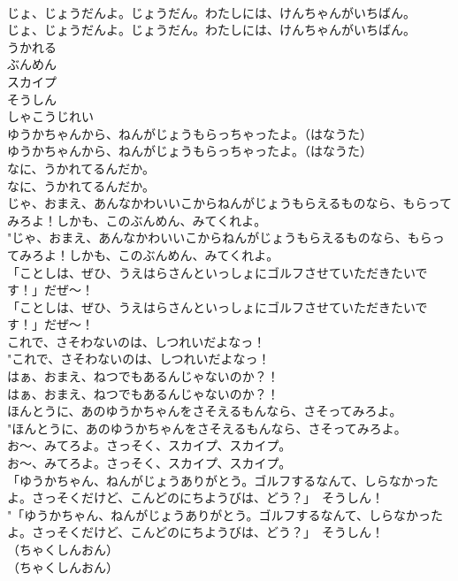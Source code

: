 \documentclass[8pt]{extreport}
\begin{document}
\begin{CJK}{UTF8}{min}
\\	じょ、じょうだんよ。じょうだん。わたしには、けんちゃんがいちばん。	
\\	じょ、じょうだんよ。じょうだん。わたしには、けんちゃんがいちばん。 
\\	うかれる
\\	ぶんめん
\\	スカイプ
\\	そうしん
\\	しゃこうじれい
\\	ゆうかちゃんから、ねんがじょうもらっちゃったよ。（はなうた）	
\\	ゆうかちゃんから、ねんがじょうもらっちゃったよ。（はなうた） 
\\	なに、うかれてるんだか。	
\\	なに、うかれてるんだか。 
\\	じゃ、おまえ、あんなかわいいこからねんがじょうもらえるものなら、もらってみろよ！しかも、このぶんめん、みてくれよ。	
\\	"じゃ、おまえ、あんなかわいいこからねんがじょうもらえるものなら、もらってみろよ！しかも、このぶんめん、みてくれよ。 
\\	「ことしは、ぜひ、うえはらさんといっしょにゴルフさせていただきたいです！」だぜ～！	
\\	「ことしは、ぜひ、うえはらさんといっしょにゴルフさせていただきたいです！」だぜ～！ 
\\	これで、さそわないのは、しつれいだよなっ！	
\\	"これで、さそわないのは、しつれいだよなっ！ 
\\	はぁ、おまえ、ねつでもあるんじゃないのか？！	
\\	はぁ、おまえ、ねつでもあるんじゃないのか？！ 
\\	ほんとうに、あのゆうかちゃんをさそえるもんなら、さそってみろよ。	
\\	"ほんとうに、あのゆうかちゃんをさそえるもんなら、さそってみろよ。 
\\	お～、みてろよ。さっそく、スカイプ、スカイプ。	
\\	お～、みてろよ。さっそく、スカイプ、スカイプ。 
\\	「ゆうかちゃん、ねんがじょうありがとう。ゴルフするなんて、しらなかったよ。さっそくだけど、こんどのにちようびは、どう？」　そうしん！	
\\	"「ゆうかちゃん、ねんがじょうありがとう。ゴルフするなんて、しらなかったよ。さっそくだけど、こんどのにちようびは、どう？」　そうしん！ 
\\	（ちゃくしんおん）	
\\	（ちゃくしんおん） 

\end{CJK}
\end{document}
